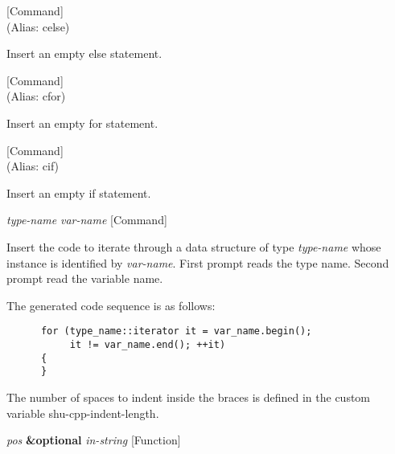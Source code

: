 \vspace{1em}
\noindent
{}
\usebox{\funcname}
 \hfill [Command]\\%
 (Alias: celse)

\begin{doc-string}
Insert an empty else statement.
\end{doc-string}

\vspace{1em}
\noindent
{}
\usebox{\funcname}
 \hfill [Command]\\%
 (Alias: cfor)

\begin{doc-string}
Insert an empty for statement.
\end{doc-string}

\vspace{1em}
\noindent
{}
\usebox{\funcname}
 \hfill [Command]\\%
 (Alias: cif)

\begin{doc-string}
Insert an empty if statement.
\end{doc-string}

\vspace{1em}
\noindent
{}
\usebox{\funcname}\emph{type-name} \emph{var-name}
 \hfill [Command]

\begin{doc-string}
Insert the code to iterate through a data structure of type \emph{type-name} whose
instance is identified by \emph{var-name}.  First prompt reads the type name.  Second
prompt read the variable name.

The generated code sequence is as follows:

\small{\begin{verbatim}
      for (type_name::iterator it = var_name.begin();
           it != var_name.end(); ++it)
      {
      }
\end{verbatim}}

The number of spaces to indent inside the braces is defined in the custom
variable shu-cpp-indent-length.
\end{doc-string}

\vspace{1em}
\noindent
{}
\usebox{\funcname}\emph{pos} \textbf{\&optional} \emph{in-string}
 \hfill [Function]
\hspace*{\wd\funcname}

